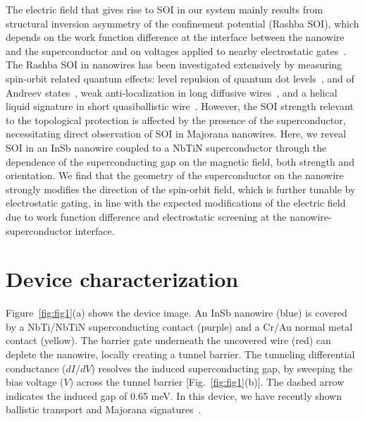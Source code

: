 The electric field that gives rise to SOI in our system mainly results from structural inversion asymmetry of the confinement potential (Rashba SOI), which depends on the work function difference at the interface between the nanowire and the superconductor and on voltages applied to nearby electrostatic gates~\cite{Vuik2016,Antipov2018,Woods2018,Mikkelsen2018}.
The Rashba SOI in nanowires has been investigated extensively by measuring spin-orbit related quantum effects: level repulsion of quantum dot levels~\cite{Fasth2007,Nadj-Perge2012}, and of Andreev states~\cite{Moor2018,Deng2016}, weak anti-localization in long \mbox{diffusive} wires~\cite{Hansen2005,Weperen2015}, and a helical liquid signature in short quasiballistic wire~\cite{Kammhuber2017}.
However, the SOI strength relevant to the topological protection is affected by the \mbox{presence} of the superconductor, necessitating direct observation of SOI in Majorana nanowires.
Here, we reveal SOI in an InSb nanowire coupled to a NbTiN superconductor through the dependence of the superconducting gap on the magnetic field, both strength and orientation.
We find that the geometry of the superconductor on the nanowire strongly modifies the direction of the spin-orbit field, which is further tunable by electrostatic gating, in line with the expected modifications of the electric field due to work function difference and electrostatic screening at the nanowire-superconductor interface.

\section{Device characterization}
Figure~\ref{fig:fig1}(a) shows the device image.
An InSb nanowire (blue) is covered by a NbTi/NbTiN superconducting contact (purple) and a Cr/Au normal metal contact (yellow).
The barrier gate underneath the uncovered wire (red) can deplete the nanowire, locally creating a tunnel barrier.
The tunneling differential conductance ($dI/dV$) resolves the induced superconducting gap, by sweeping the bias voltage ($V$) across the tunnel barrier [Fig.~\ref{fig:fig1}(b)].
The dashed arrow indicates the induced gap of 0.65 meV.
In this device, we have recently shown ballistic transport and Majorana signatures~\cite{Guel2018}.


